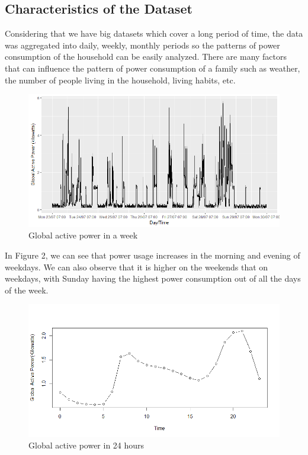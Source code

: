 \documentclass[letterpaper, 11pt]{article}%
\begin{document}
\subsection{Characteristics of the Dataset}
Considering that we have big datasets which cover a long period of time, the data was aggregated into daily, weekly, monthly periods so the patterns of power consumption of the household can be easily analyzed. There are many factors that can influence the pattern of power consumption of a family such as weather, the number of people living in the household, living habits, etc. 
\begin{figure}[H]
  \centering
  \includegraphics[scale=0.5]{fig1}
  \caption{Global active power in a week}
\end{figure}  
In Figure 2, we can see that power usage increases in the morning and evening of weekdays. We can also observe that it is higher on the weekends that on weekdays, with Sunday having the highest power consumption out of all the days of the week. 
\begin{figure}[H]
  \centering
  \includegraphics[scale=0.4]{fig2}
  \caption{Global active power in 24 hours}
\end{figure}  
\end{document}
